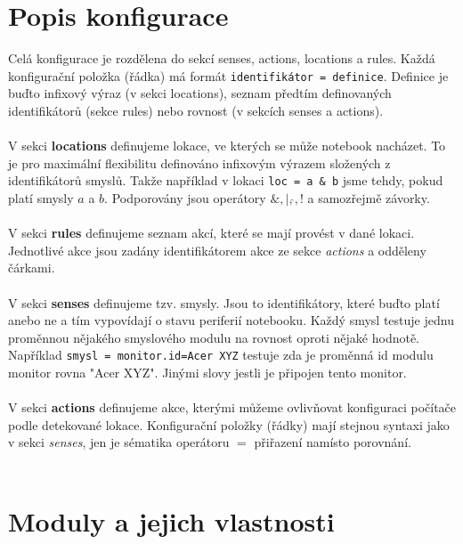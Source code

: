\documentclass[10pt,a4paper]{article}
\begin{document}
\section*{Popis konfigurace}
Celá konfigurace je rozdělena do sekcí senses, actions, locations a rules. Každá konfigurační položka (řádka) má formát \texttt{identifikátor = definice}. Definice je buďto infixový výraz (v sekci locations), seznam předtím definovaných identifikátorů (sekce rules) nebo rovnost (v sekcích senses a actions). \\
\\
V sekci \textbf{locations} definujeme lokace, ve kterých se může notebook nacházet. To je pro maximální flexibilitu definováno infixovým výrazem složených z identifikátorů smyslů. Takže například v lokaci \texttt{loc = a \& b} jsme tehdy, pokud platí smysly $a$ a $b$. Podporovány jsou operátory $\&,|,\hat{},!$ a samozřejmě závorky. \\
\\
V sekci \textbf{rules} definujeme seznam akcí, které se mají provést v dané lokaci. Jednotlivé akce jsou zadány identifikátorem akce ze sekce \textit{actions} a odděleny čárkami.\\
\\
V sekci \textbf{senses} definujeme tzv. smysly. Jsou to identifikátory, které buďto platí anebo ne a tím vypovídají o stavu periferií notebooku. Každý smysl testuje jednu proměnnou nějakého smyslového modulu na rovnost oproti nějaké hodnotě. Například \texttt{smysl = monitor.id=Acer XYZ} testuje zda je proměnná id modulu monitor rovna "Acer XYZ". Jinými slovy jestli je připojen tento monitor. \\
\\
V sekci \textbf{actions} definujeme akce, kterými můžeme ovlivňovat konfiguraci počítače podle detekované lokace. Konfigurační položky (řádky) mají stejnou syntaxi jako v sekci \textit{senses}, jen je sématika operátoru $=$ přiřazení namísto porovnání. \\
\\

\section*{Moduly a jejich vlastnosti}
\end{document}
